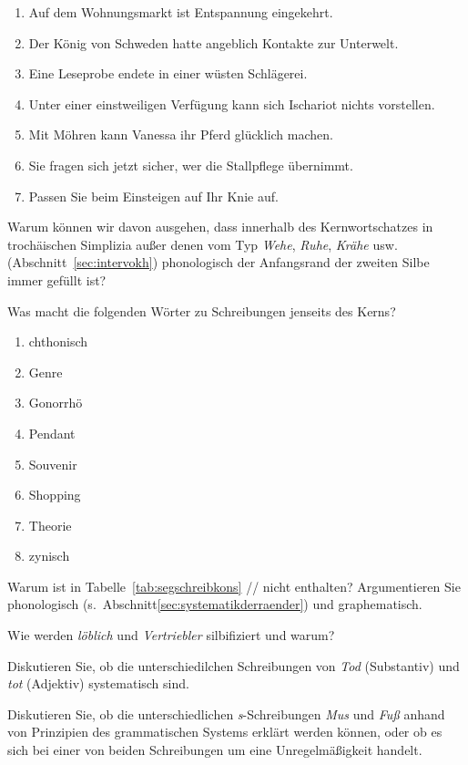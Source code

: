 \begin{enumerate}\Lf
  \item Auf dem Wohnungsmarkt ist Entspannung eingekehrt.
  \item Der König von Schweden hatte angeblich Kontakte zur Unterwelt.
  \item Eine Leseprobe endete in einer wüsten Schlägerei.
  \item Unter einer einstweiligen Verfügung kann sich Ischariot nichts vorstellen.
  \item Mit Möhren kann Vanessa ihr Pferd glücklich machen.
  \item Sie fragen sich jetzt sicher, wer die Stallpflege übernimmt.
  \item Passen Sie beim Einsteigen auf Ihr Knie auf. 
\end{enumerate}

\Uebung[\tristar] \label{u145} Warum können wir davon ausgehen, dass innerhalb des Kernwortschatzes in trochäischen Simplizia außer denen vom Typ \textit{Wehe}, \textit{Ruhe}, \textit{Krähe} usw. (Abschnitt~\ref{sec:intervokh}) phonologisch der Anfangsrand der zweiten Silbe immer gefüllt ist?

\Uebung \label{u146} Was macht die folgenden Wörter zu Schreibungen jenseits des Kerns?

\begin{enumerate}\Lf
  \item chthonisch
  \item Genre
  \item Gonorrhö
  \item Pendant
  \item Souvenir
  \item Shopping
  \item Theorie
  \item zynisch
\end{enumerate}

\Uebung[\tristar] \label{u147} Warum ist in Tabelle~\ref{tab:segschreibkons} // nicht enthalten?
Argumentieren Sie phonologisch (s.\ Abschnitt\ref{sec:systematikderraender}) und graphematisch.

\Uebung[\tristar] \label{u148} Wie werden \textit{löblich} und \textit{Vertriebler} silbifiziert und warum?

\Uebung[\tristar] \label{u149} Diskutieren Sie, ob die unterschiedilchen Schreibungen von \textit{Tod} (Substantiv) und \textit{tot} (Adjektiv) systematisch sind.

\Uebung[\tristar] \label{u1410} Diskutieren Sie, ob die unterschiedlichen \textit{s}-Schreibungen \textit{Mus} und \textit{Fuß} anhand von Prinzipien des grammatischen Systems erklärt werden können, oder ob es sich bei einer von beiden Schreibungen um eine Unregelmäßigkeit handelt.
